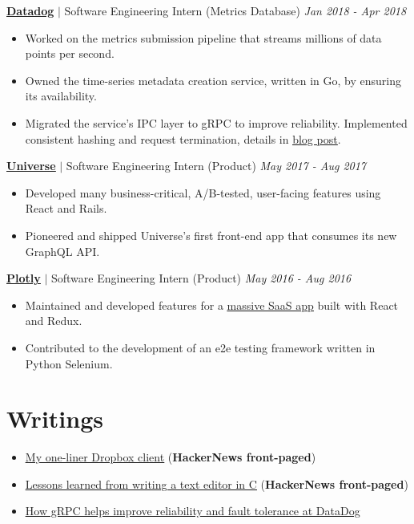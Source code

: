 \documentclass[paper=a4,fontsize=15pt]{scrartcl}
\newcommand{\bighalfspace}{\vspace*{0.75em}}
\begin{document}
\bighalfspace
\normalsize
\noindent \href{https://datadoghq.com}{\textbf{\ul{Datadog}}}
$\vert$ \small Software Engineering Intern (Metrics Database)
{\hfill \footnotesize \textit{Jan 2018 - Apr 2018}}
\begin{itemize}[noitemsep,leftmargin=20pt,label=\raisebox{0.25ex}{\tiny$\bullet$},topsep=5pt]
  \small
  \item Worked on the metrics submission pipeline that streams millions of data
    points per second.
  \item Owned the time-series metadata creation service, written in Go, by
    ensuring its availability.
  \item Migrated the service's IPC layer to gRPC to improve reliability.
    Implemented consistent hashing and request termination, details in
    \href{http://lpan.io/migrating-to-grpc}{\ul{blog post}}.
\end{itemize}

\bighalfspace
\normalsize
\noindent \href{https://universe.com}{\ul{\textbf{Universe}}}
$\vert$ \small Software Engineering Intern (Product)
{\hfill \footnotesize \textit{May 2017 - Aug 2017}}
\begin{itemize}[noitemsep,leftmargin=20pt,label=\raisebox{0.25ex}{\tiny$\bullet$},topsep=5pt]
  \small
  \item Developed many business-critical, A/B-tested, user-facing features
    using React and Rails.
  \item Pioneered and shipped Universe's first front-end app that consumes its
    new GraphQL API.
\end{itemize}

\bighalfspace
\normalsize
\noindent \href{https://plot.ly}{\textbf{\ul{Plotly}}}
$\vert$ \small Software Engineering Intern (Product)
{\hfill \footnotesize \textit{May 2016 - Aug 2016}}
\begin{itemize}[noitemsep,leftmargin=20pt,label=\raisebox{0.25ex}{\tiny$\bullet$},topsep=5pt]
  \small
  \item Maintained and developed features for a
    \href{https://plot.ly/online-chart-maker/}{\ul{massive SaaS app}} built with
    React and Redux.
  \item Contributed to the development of an e2e testing framework written in
    Python Selenium.
\end{itemize}

\section*{Writings}{}
\begin{itemize}[noitemsep,leftmargin=20pt,label=\raisebox{0.25ex}{\tiny$\bullet$},topsep=5pt]
  \small
  \item \href{http://lpan.io/one-liner-dropbox-client}{\ul{My one-liner Dropbox
        client}} (\textbf{HackerNews front-paged})
  \item \href{http://lpan.io/what-i-learnt-from-viw}{\ul{Lessons learned from
        writing a text editor in C}} (\textbf{HackerNews front-paged})
  \item \href{http://lpan.io/migrating-to-grpc}{\ul{How gRPC helps improve
        reliability and fault tolerance at DataDog}}
\end{itemize}
\end{document}

